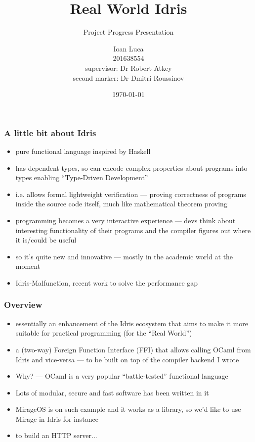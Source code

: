 \documentclass{beamer}
\title{Real World Idris}
\subtitle{Project Progress Presentation}
\author{Ioan Luca \\ 201638554 \\ \small supervisor: Dr Robert Atkey \\
	\small second marker: Dr Dmitri Roussinov \\}
\institute{University of Strathclyde}
\date{\today}
\begin{document}
\frame{\titlepage}


\begin{frame}
	\frametitle{A little bit about Idris}
	\begin{itemize}
		\item pure functional language inspired by Haskell
		      \pause
		\item has dependent types, so can encode complex properties
		      \pause
		      about programs into types enabling ``Type-Driven Development''
		\item i.e. allows formal lightweight verification --- proving
		      correctness of programs inside the source code itself,
		      much like mathematical theorem proving
		      \pause
		\item programming becomes a very interactive experience
		      --- devs think about interesting functionality of their programs
		      and the compiler figures out where it is/could be useful
		      \pause
		\item so it's quite new and innovative --- mostly
		      in the academic world at the moment
		      \pause
		\item Idris-Malfunction, recent work to solve the performance gap
	\end{itemize}
\end{frame}


\begin{frame}
	\frametitle{Overview}

	\begin{itemize}
		\item essentially an enhancement of the Idris ecosystem
		      that aims to make it more suitable for practical
		      programming (for the ``Real World'')
		      \pause
		\item a (two-way) Foreign Function Interface (FFI) that
		      allows calling OCaml
		      from Idris and vice-versa --- to be built on top of the
		      compiler backend I wrote
		      \pause
		\item Why? --- OCaml is a very popular ``battle-tested''
		      functional language
		      \pause
		\item Lots of modular, secure and fast software has been written in it
		      \pause
		\item MirageOS is on such example and it works as a library, so we'd
		      like to use Mirage in Idris for instance
		      \pause
		\item to build an HTTP server...
	\end{itemize}
\end{frame}
\end{document}
